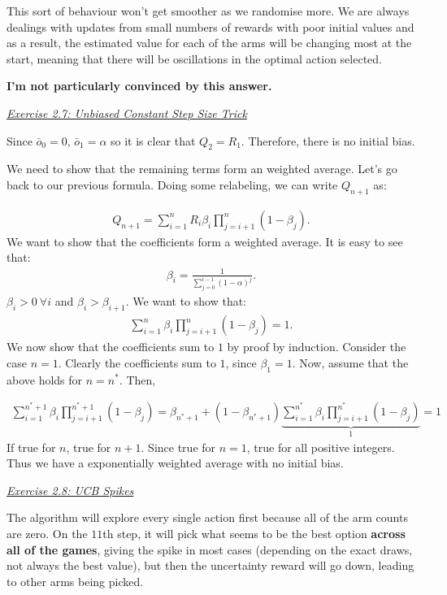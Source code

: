 \documentclass{article}
\newcommand{\myq}[1]{%
	\vspace{1em}
	\noindent\underline{\emph{Exercise #1}}\vspace{0.25em}\linebreak
}
\begin{document}
This sort of behaviour won't get smoother as we randomise more. We are always dealings with updates from small numbers of rewards with poor initial values and as a result, the estimated value for each of the arms will be changing most at the start, meaning that there will be oscillations in the optimal action selected. 

\textbf{I'm not particularly convinced by this answer. }

\myq{2.7: Unbiased Constant Step Size Trick}
Since $\bar{o}_0 = 0 $, $\bar{o}_1 = \alpha$ so it is clear that $Q_2 = R_1$. Therefore, there is no initial bias. 

We need to show that the remaining terms form an weighted average. Let's go back to our previous formula. Doing some relabeling, we can write $Q_{n+1}$ as:

\begin{align}
Q_{n+1} = \sum_{i=1}^n R_i \beta_i \prod_{j=i+1}^n  (1- \beta_j).
\end{align}
We want to show that the coefficients form a weighted average. It is easy to see that:
\begin{align}
\beta_i = \frac{1}{\sum_{j=0}^{i-1} (1-\alpha)^j}.
\end{align}
$\beta_i > 0\ \forall i$ and $\beta_i > \beta_{i+1}$. We want to show that:
\begin{align}
\sum_{i=1}^n \beta_i \prod_{j=i+1}^n  (1- \beta_j) = 1.
\end{align}
We now show that the coefficients sum to $1$ by proof by induction. Consider the case $n=1$.  Clearly the coefficients sum to $1$, since $\beta_1 = 1$. Now, assume that the above holds for $n=n^*$. Then,

\begin{align}
\sum_{i=1}^{n^* + 1} \beta_i \prod_{j=i+1}^{n^* + 1}  (1- \beta_j) = \beta_{n^*+1} + (1-\beta_{n^*+1}) \underbrace{\sum_{i=1}^{n^*} \beta_i \prod_{j=i+1}^{n^*}  (1- \beta_j)}_{1} = 1
\end{align} 
If true for $n$, true for $n+1$. Since true for $n=1$, true for all positive integers. Thus we have a exponentially weighted average with no initial bias.  

\myq{2.8: UCB Spikes}
The algorithm will explore every single action first because all of the arm counts are zero. On the $11$th step, it will pick what seems to be the best option \textbf{across all of the games}, giving the spike in most cases (depending on the exact draws, not always the best value), but then the uncertainty reward will go down, leading to other arms being picked. 
\end{document}
